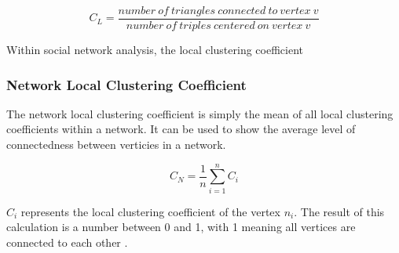 \begin{equation}
C_L = \frac{number\: of\: triangles\: connected\: to\: vertex\: v}{number\: of\: triples\: centered\: on\: vertex\: v}
\label{eq:localcc}
\end{equation}

Within social network analysis, the local clustering coefficient

\subsubsection{Network Local Clustering Coefficient}
The network local clustering coefficient is simply the mean of all local clustering coefficients within a network. It can be used to show the average level of connectedness between verticies in a network.

\begin{equation}
C_N = \frac{1}{n}\sum_{i=1}^{n} C_i
\label{eq:networkcc}
\end{equation}

$C_i$ represents the local clustering coefficient of the vertex $n_i$. The result of this calculation is a number between 0 and 1, with 1 meaning all vertices are connected to each other \cite{watts98}.
